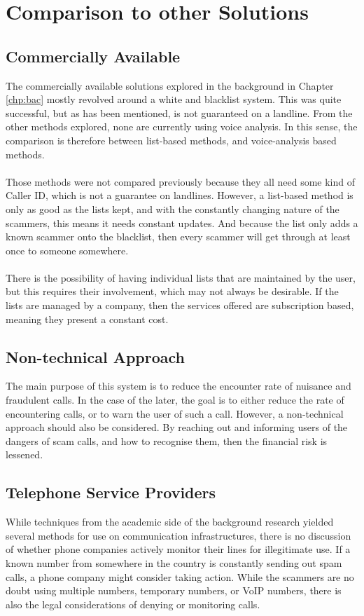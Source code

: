\documentclass[main.tex]{subfiles}
\begin{document}
\section{Comparison to other Solutions}
\subsection{Commercially Available}
The commercially available solutions explored in the background in Chapter \ref{chp:bac} mostly revolved around a white and blacklist system. This was quite successful, but as has been mentioned, is not guaranteed on a landline. From the other methods explored, none are currently using voice analysis. In this sense, the comparison is therefore between list-based methods, and voice-analysis based methods.
\\\\
Those methods were not compared previously because they all need some kind of Caller ID, which is not a guarantee on landlines. However, a list-based method is only as good as the lists kept, and with the constantly changing nature of the scammers, this means it needs constant updates. And because the list only adds a known scammer onto the blacklist, then every scammer will get through at least once to someone somewhere.
\\\\
There is the possibility of having individual lists that are maintained by the user, but this requires their involvement, which may not always be desirable. If the lists are managed by a company, then the services offered are subscription based, meaning they present a constant cost.

\subsection{Non-technical Approach}
The main purpose of this system is to reduce the encounter rate of nuisance and fraudulent calls. In the case of the later, the goal is to either reduce the rate of encountering calls, or to warn the user of such a call. However, a non-technical approach should also be considered. By reaching out and informing users of the dangers of scam calls, and how to recognise them, then the financial risk is lessened.

\subsection{Telephone Service Providers}
While techniques from the academic side of the background research yielded several methods for use on communication infrastructures, there is no discussion of whether phone companies actively monitor their lines for illegitimate use. If a known number from somewhere in the country is constantly sending out spam calls, a phone company might consider taking action. While the scammers are no doubt using multiple numbers, temporary numbers, or VoIP numbers, there is also the legal considerations of denying or monitoring calls.
\end{document}
